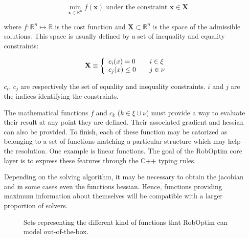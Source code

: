 \documentclass[conference,final,a4paper,twocolumn,9pt]{IEEEtran}
\begin{document}
\begin{equation}\label{eq:optimization}
  \min_{\mathbf{x} \in \mathbb{R}^n} f(\mathbf{x}) \text{ under the constraint } \mathbf{x} \in \mathbf{X}
\end{equation}

where $f : \mathbb{R}^n \mapsto \mathbb{R}$ is the cost function and
$\mathbf{X} \subset \mathbb{R}^n$ is the space of the admissible
solutions. This space is usually defined by a set of inequality and
equality constraints:

\begin{equation}
  \mathbf{X} \equiv \left\{
  \begin{array}{l l}
    c_i (x) = 0    & \quad i \in \xi \\
    c_j (x) \leq 0 & \quad j \in \nu \\
  \end{array} \right.
\end{equation}

$c_i$, $c_j$ are respectively the set of equality and inequality
constraints. $i$ and $j$ are the indices identifying the constraints.

The mathematical functions $f$ and $c_k$ ($k \in \xi \cup \nu$) must
provide a way to evaluate their result at any point they are
defined. Their associated gradient and hessian can also be
provided. To finish, each of these function may be catorized as
belonging to a set of functions matching a particular structure which
may help the resolution. One example is linear functions. The goal of
the RobOptim core layer is to express these features through the C++
typing rules.


Depending on the solving algorithm, it may be necessary to obtain the
jacobian and in some cases even the functions hessian. Hence,
functions providing maximum information about themselves will be
compatible with a larger proportion of solvers.

\begin{figure}[ht!]
  \begin{center}
  \end{center}
  \caption{Sets representing the different kind of functions that
    RobOptim can model out-of-the-box.}\label{fig:functions}
\end{figure}
\end{document}

